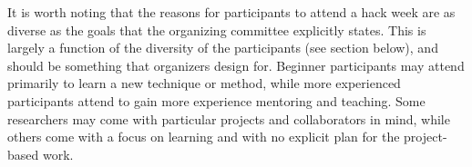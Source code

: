 It is worth noting that the reasons for participants to attend a hack week are as diverse as the goals that the organizing committee explicitly states.
This is largely a function of the diversity of the participants (see section below), and should be something that organizers design for.
Beginner participants may attend primarily to learn a new technique or method, while more experienced participants attend to gain more experience mentoring and teaching.
Some researchers may come with particular projects and collaborators in mind, while others come with a focus on learning and with no explicit plan for the project-based work.
